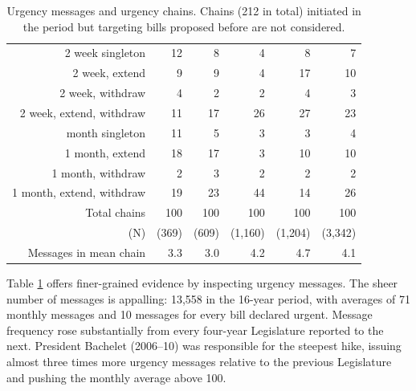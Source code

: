 \documentclass[letter,12pt]{article}
\begin{document}
\begin{table}
\begin{tabular}{rrrrr|r}
2 week singleton          & 12 & 8  & 4  & 8  &   7  \\
2 week, extend            & 9  & 9  & 4  & 17 &  10  \\
2 week, withdraw          & 4  & 2  & 2  & 4  &   3  \\
2 week, extend, withdraw  & 11 & 17 & 26 & 27 &  23  \\ \hdashline
1 month singleton         & 11 & 5  & 3  & 3  &   4  \\
1 month, extend           & 18 & 17 & 3  & 10 &  10  \\
1 month, withdraw         & 2  & 3  & 2  & 2  &   2  \\
1 month, extend, withdraw & 19 & 23 & 44 & 14 &  26  \\ \hline
Total chains              & 100 & 100 & 100 & 100 & 100  \\
(N)                       & (369) & (609) & (1,160) & (1,204) &(3,342) \\ 
Messages in mean chain    & 3.3   & 3.0   & 4.2     & 4.7     & 4.1 \\ \hline
\end{tabular}
\caption{Urgency messages and urgency chains. Chains (212 in total) initiated in the period but targeting bills proposed before are not considered.}\label{t:freqUrg}
\end{table}

Table \ref{t:freqUrg} offers finer-grained evidence by inspecting urgency messages. The sheer number of messages is appalling: 13,558 in the 16-year period, with averages of 71 monthly messages and 10 messages for every bill declared urgent. Message frequency rose substantially from every four-year Legislature reported to the next. President Bachelet (2006--10) was responsible for the steepest hike, issuing almost three times more urgency messages relative to the previous Legislature and pushing the monthly average above 100. 
\end{document}
